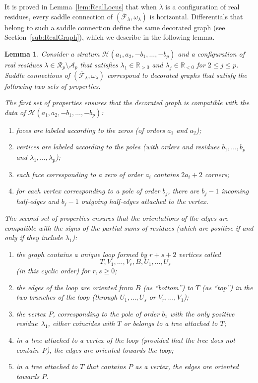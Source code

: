 \documentclass[11pt]{article}
\newcommand\calH{{\mathcal H}}
\newtheorem{lem}[thm]{Lemma}
\theoremstyle{definition}
\begin{document}
It is proved in Lemma~\ref{lem:RealLocus} that when $\lambda$ is a configuration of real residues, every saddle connection of
$(\overline{\mathcal{F}}_{\lambda}, \omega_\lambda)$ is horizontal. Differentials that belong to such a saddle connection define the same decorated graph (see Section~\ref{sub:RealGraph}), which we describe in the following lemma.

\begin{lem}\label{lem:Sec8SaddleConnection}
Consider a stratum $\calH(a_{1},a_{2},-b_{1},\dots,-b_{p})$ and a configuration of real residues $\lambda\in \mathcal{R}_{p} \setminus \mathcal{A}_{p}$ that satisfies $\lambda_{1} \in \mathbb{R}_{>0}$ and $\lambda_{j} \in \mathbb{R}_{<0}$ for $2 \leq j \leq p$.
Saddle connections of $(\overline{\mathcal{F}}_{\lambda}, \omega_\lambda)$ correspond to decorated graphs that satisfy the following two sets of properties.

The first set of properties ensures that the decorated graph is compatible with the data of $\calH(a_{1},a_{2},-b_{1},\dots,-b_{p})$:
\begin{enumerate}
\item faces are labeled according to the zeros (of orders $a_{1}$ and $a_{2}$);
\item vertices are labeled according to the poles (with orders and residues $b_{1},\dots,b_{p}$ and $\lambda_{1},\dots,\lambda_{p}$);
\item each face corresponding to a zero of order $a_{i}$ contains $2a_{i}+2$ corners;
\item for each vertex corresponding to a pole of order $b_{j}$, there are $b_{j}-1$ incoming half-edges and $b_{j}-1$ outgoing half-edges attached to the vertex.
\end{enumerate}
The second set of properties ensures that the orientations of the edges are compatible with the signs of the partial sums of residues (which are positive if and only if they include $\lambda_{1}$):
\begin{enumerate}
\item the graph contains a unique loop formed by $r+s+2$ vertices called
\[
T,V_{1},\dots,V_{r},B,U_{1},\dots,U_{s}
\]
(in this cyclic order) for $r,s \geq 0$;
\item the edges of the loop are oriented from $B$ (as ``bottom'') to $T$ (as ``top'') in the two branches of the loop (through $U_{1},\dots,U_{s}$ or $V_{r},\dots,V_{1}$);
\item the vertex $P$, corresponding to the pole of order $b_{1}$ with the only positive residue~$\lambda_{1}$, either coincides with $T$ or belongs to a tree attached to $T$;
\item in a tree attached to a vertex of the loop (provided that the tree does not contain~$P$), the edges are oriented towards the loop;
\item in a tree attached to $T$ that contains $P$ as a vertex, the edges are oriented towards $P$.
\end{enumerate}


\end{lem}
\end{document}

